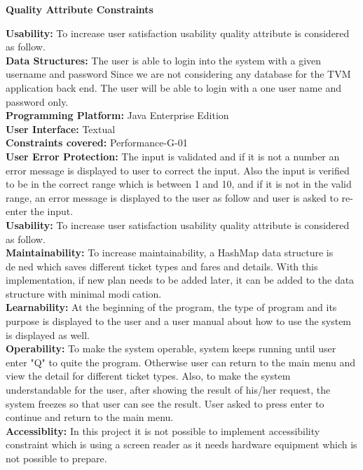\documentclass[a4paper,12pt]{report}
\begin{document}
\begin{flushleft}
	\vspace{0.5cm}
	\textbf{Quality Attribute Constraints \cite{qualitykamthan}}
	
	\vspace{0.5cm}
	\textbf{Usability:} To increase user satisfaction usability quality attribute is considered as follow.\\
	
	\vspace{0.5cm}
	\textbf{Data Structures: }The user is able to login into the system with a given username and password  Since we are not considering any database for the TVM application back end. The user will be able to login with a one user name and password only.\\
	
	\vspace{0.5cm}
	\textbf{Programming Platform: } Java Enterprise Edition \\
	\textbf{User Interface:} Textual \\
	\textbf{Constraints covered:} Performance-G-01 \\
	
	\vspace{0.5cm}
	\textbf{User Error Protection:} The input is validated and if it is not a number an error message is displayed to user to correct the input. Also the input is verified to be in the correct range which is between 1 and 10, and if it is not in the valid range, an error message is displayed to the user as follow and user is asked to re-enter the input. \\
	\textbf{Usability:} To increase user satisfaction usability quality attribute is considered as follow.\\
	\textbf{Maintainability: } To increase maintainability, a HashMap data structure is dened which saves different ticket types and fares and details. With this implementation, if new plan needs to be added later, it can be added to the data structure with minimal modication. \\
	\textbf{Learnability: } At the beginning of the program, the type of program and its purpose is	displayed to the user and a user manual about how to use the system is 	displayed as well. \\
	\textbf{Operability: }To make the system operable, system keeps running until user enter "Q" to quite the program. Otherwise user can return to the main menu and view 	the detail for different ticket types. Also, to make the system understandable for the user, after showing the result of his/her request, the system freezes so that user can see the result. User asked to press enter to continue and return to the main menu. \\
	\textbf{Accessiblity: } In this project it is not possible to implement accessibility constraint which is using a screen reader as it needs hardware equipment which is not possible to prepare. \\
	
\end{flushleft}
\end{document}
